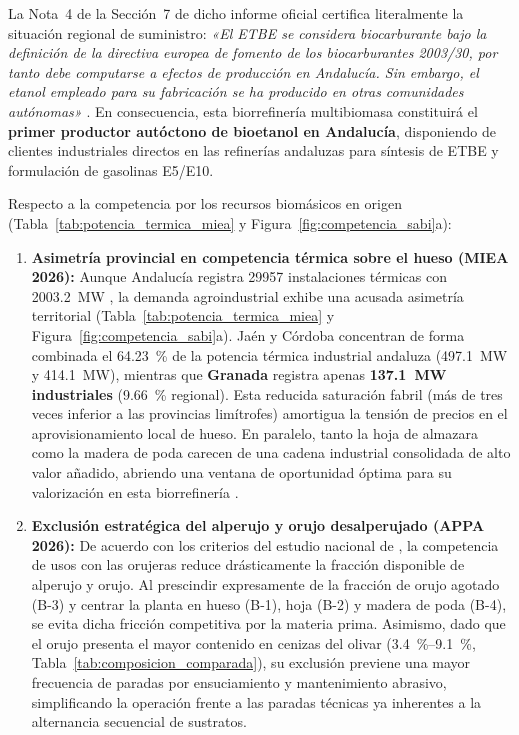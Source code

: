 \documentclass{report}
\begin{document}
La Nota~4 de la Sección~7 de dicho informe oficial certifica literalmente la situación regional de suministro: \textit{«El ETBE se considera biocarburante bajo la definición de la directiva europea de fomento de los biocarburantes 2003/30, por tanto debe computarse a efectos de producción en Andalucía. Sin embargo, el etanol empleado para su fabricación se ha producido en otras comunidades autónomas»} \autocite[Sección~7, Nota~4]{AAE2026}. En consecuencia, esta biorrefinería multibiomasa constituirá el \textbf{primer productor autóctono de bioetanol en Andalucía}, disponiendo de clientes industriales directos en las refinerías andaluzas para síntesis de ETBE y formulación de gasolinas E5/E10.

Respecto a la competencia por los recursos biomásicos en origen (Tabla~\ref{tab:potencia_termica_miea} y Figura~\ref{fig:competencia_sabi}a):
\begin{enumerate}
    \item \textbf{Asimetría provincial en competencia térmica sobre el hueso (MIEA 2026):} Aunque Andalucía registra \num{29957} instalaciones térmicas con \SI{2003.2}{\mega\watt} \autocite[Sección~6.2]{AAE2026}, la demanda agroindustrial exhibe una acusada asimetría territorial (Tabla~\ref{tab:potencia_termica_miea} y Figura~\ref{fig:competencia_sabi}a). Jaén y Córdoba concentran de forma combinada el \SI{64.23}{\percent} de la potencia térmica industrial andaluza (\SI{497.1}{\mega\watt} y \SI{414.1}{\mega\watt}), mientras que \textbf{Granada} registra apenas \textbf{\SI{137.1}{\mega\watt} industriales} (\SI{9.66}{\percent} regional). Esta reducida saturación fabril (más de tres veces inferior a las provincias limítrofes) amortigua la tensión de precios en el aprovisionamiento local de hueso. En paralelo, tanto la hoja de almazara como la madera de poda carecen de una cadena industrial consolidada de alto valor añadido, abriendo una ventana de oportunidad óptima para su valorización en esta biorrefinería \autocite{MoranAlarcon2026}.
    \item \textbf{Exclusión estratégica del alperujo y orujo desalperujado (APPA 2026):} De acuerdo con los criterios del estudio nacional de \textcite[Sección~4.2.3, Tabla~23]{APPA2026}, la competencia de usos con las orujeras reduce drásticamente la fracción disponible de alperujo y orujo. Al prescindir expresamente de la fracción de orujo agotado (B-3) y centrar la planta en hueso (B-1), hoja (B-2) y madera de poda (B-4), se evita dicha fricción competitiva por la materia prima. Asimismo, dado que el orujo presenta el mayor contenido en cenizas del olivar (\SI{3.4}{\percent}--\SI{9.1}{\percent}, Tabla~\ref{tab:composicion_comparada}), su exclusión previene una mayor frecuencia de paradas por ensuciamiento y mantenimiento abrasivo, simplificando la operación frente a las paradas técnicas ya inherentes a la alternancia secuencial de sustratos.
\end{enumerate}
\end{document}
